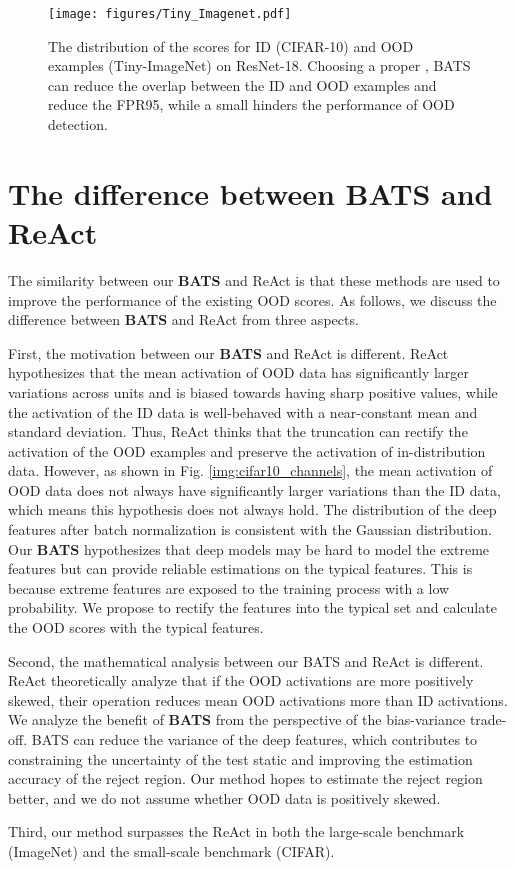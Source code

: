 \documentclass{article}
\begin{document}
\begin{figure}[htbp] 
\centering
\texttt{[image: figures/Tiny\_Imagenet.pdf]}
\caption{The distribution of the scores for ID (CIFAR-10) and OOD examples (Tiny-ImageNet) on ResNet-18. Choosing a proper , BATS can reduce the overlap between the ID and OOD examples and reduce the FPR95, while a small  hinders the performance of OOD detection.}
\label{img:Tiny_Imagenet}
\end{figure} 
 
 
 {
 \section{The difference between BATS and ReAct}
 
 The similarity between our \textbf{BATS} and ReAct is that these methods are used to improve the performance of the existing OOD scores. As follows, we discuss the difference between \textbf{BATS} and ReAct from three aspects.

 First, the motivation between our \textbf{BATS} and ReAct is different. ReAct hypothesizes that the mean activation of OOD data has significantly larger variations across units and is biased towards having sharp positive values, while the activation of the ID data is well-behaved with a near-constant mean and standard deviation. Thus, ReAct thinks that the truncation can rectify the activation of the OOD examples and preserve the activation of in-distribution data.
 However, as shown in Fig. \ref{img:cifar10_channels}, the mean activation of OOD data does not always have significantly larger variations than the ID data, which means this hypothesis does not always hold. 
 The distribution of the deep features after batch normalization is consistent with the Gaussian distribution. Our \textbf{BATS} hypothesizes that deep models may be hard to model the extreme features but can provide reliable estimations on the typical features. This is because extreme features are exposed to the training process with a low probability. We propose to rectify the features into the typical set and calculate the OOD scores with the typical features.

 Second, the mathematical analysis between our BATS and ReAct is different. ReAct theoretically analyze that if the OOD activations are more positively skewed, their operation reduces mean OOD activations more than ID activations.
 We analyze the benefit of \textbf{BATS} from the perspective of the bias-variance trade-off. BATS can reduce the variance of the deep features, which contributes to constraining the uncertainty of the test static  and improving the estimation accuracy of the reject region. Our method hopes to estimate the reject region better, and we do not assume whether OOD data is positively skewed.

 Third, our method surpasses the ReAct in both the large-scale benchmark (ImageNet) and the small-scale benchmark (CIFAR).
 
}
\end{document}
